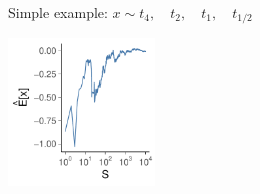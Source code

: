 \documentclass[english,t]{beamer}
\begin{document}
\begin{frame}{Simple example: $x \sim t_4, \quad t_2, \quad t_1, \quad t_{1/2}$}

\vspace{-0.5\baselineskip}
\hspace{-1cm}
\begin{minipage}[t]{1.0\linewidth}
\includegraphics[width=3.9cm]{Ex2.pdf}%
\end{minipage}


\end{frame}
\end{document}
